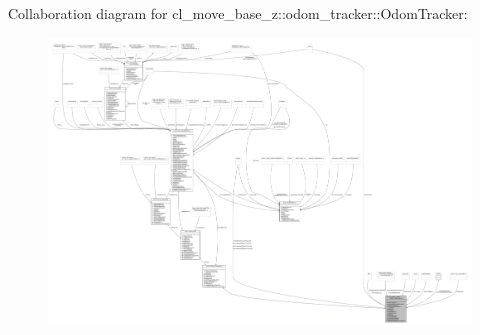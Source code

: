 Collaboration diagram for cl\+\_\+move\+\_\+base\+\_\+z\+:\+:odom\+\_\+tracker\+:\+:Odom\+Tracker\+:
\nopagebreak
\begin{figure}[H]
\begin{center}
\leavevmode
\includegraphics[width=350pt]{classcl__move__base__z_1_1odom__tracker_1_1OdomTracker__coll__graph}
\end{center}
\end{figure}
